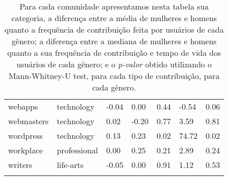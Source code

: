 \begin{longtabu}{@{}
	p{0.17\linewidth}
	p{0.2\linewidth}
	P{0.1\linewidth}
	P{0.1\linewidth}
	P{0.1\linewidth}
	P{0.1\linewidth}
	p{0.1\linewidth}@{}}
webapps          & technology         & -0.04          & 0.00           & 0.44   & -0.54             & 0.06             \\
webmasters       & technology         & 0.02           & -0.20          & 0.77   & 3.59              & 0.81             \\
wordpress        & technology         & 0.13           & 0.23           & 0.02   & 74.72             & 0.02             \\
workplace        & professional       & 0.00           & 0.25           & 0.21   & 2.89              & 0.24             \\
writers          & life-arts          & -0.05          & 0.00           & 0.91   & 1.12              & 0.53             \\ \bottomrule

\caption[Resultados estatísticos para o tempo de dedicação à comunidade]{Para cada comunidade apresentamos nesta tabela sua categoria, a diferença entre a média de mulheres e homens quanto a frequência de contribuição feita por usuários de cada gênero; a diferença entre a mediana de mulheres e homens quanto a sua frequência de contribuição e tempo de vida dos usuários de cada gênero; e o \textit{p-valor} obtido utilizando o Mann-Whitney-U test, para cada tipo de contribuição, para cada gênero.}
\end{longtabu}